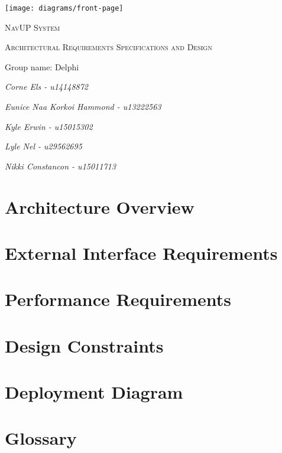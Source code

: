 \documentclass{article}
\begin{document}
\begin{titlepage}
	\centering
	\texttt{[image: diagrams/front-page]}
	\vfill
	{\scshape\LARGE NavUP System\par}
	\vfill
	{\scshape\Large Architectural Requirements Specifications and Design\par}
	\vfill
	{\Large Group name: Delphi\par}
	\bigskip 
	{\itshape\Large Corne Els - u14148872\par}	
	{\itshape\Large Eunice Naa Korkoi Hammond - u13222563\par}
	{\itshape\Large Kyle Erwin - u15015302\par}
  {\itshape\Large Lyle Nel - u29562695\par}
	{\itshape\Large Nikki Constancon - u15011713\par}
	\vfill
\end{titlepage}

\tableofcontents

\clearpage

\section{Architecture Overview}


\section{External Interface Requirements}


\section{Performance Requirements}


\section{Design Constraints}


\pagebreak
\section{Deployment Diagram}


\section{Glossary}

\end{document}
